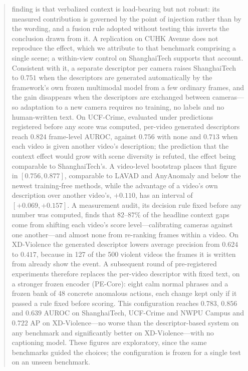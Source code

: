 \documentclass[a4paper,fleqn]{cas-sc}
\begin{document}
\begin{abstract}
finding is that verbalized context is load-bearing but not robust: its measured
contribution is governed by the point of injection rather than by the wording,
and a fusion rule adopted without testing this inverts the conclusion drawn from
it. A replication on CUHK Avenue does not reproduce the effect, which we
attribute to that benchmark comprising a single scene; a within-view control on
ShanghaiTech supports that account. Consistent with it, a separate descriptor per
camera raises ShanghaiTech to $0.751$ when the descriptors are generated
automatically by the framework's own frozen multimodal model from a few ordinary
frames, and the gain disappears when the descriptors are exchanged between
cameras---so adaptation to a new camera requires no training, no labels and no
human-written text. On UCF-Crime, evaluated under predictions registered before
any score was computed, per-video generated descriptors reach $0.824$
frame-level AUROC, against $0.756$ with none and $0.713$ when each video is given
another video's description; the prediction that the context effect would grow
with scene diversity is refuted, the effect being comparable to ShanghaiTech's.
A video-level bootstrap places that figure in $[0.756, 0.877]$, comparable to
LAVAD and AnyAnomaly and below the newest training-free methods, while the
advantage of a video's own description over another video's, $+0.110$, has an
interval of $[+0.069, +0.157]$. A measurement audit, its decision rule fixed
before any number was computed, finds that $82$--$87\%$ of the headline context
gaps come from shifting each video's score level---calibrating cameras against
one another---and almost none from re-ranking frames within a video. On
XD-Violence the generated descriptor lowers average precision from $0.624$ to
$0.417$, because in 127 of the 500 violent videos the frames it is written from
already show the event. A subsequent round of pre-registered experiments
therefore replaces the per-video descriptor with fixed text, on a stronger frozen
encoder (PE-Core): eight calm normal phrases and a frozen bank of 48 concrete
anomalous actions, each change kept only if it passed a rule fixed before
scoring. This configuration reaches $0.783$, $0.856$ and $0.639$ AUROC on
ShanghaiTech, UCF-Crime and NWPU Campus and $0.722$ AP on XD-Violence---no worse
than the descriptor-based system on any benchmark and significantly better on
XD-Violence---with no captioning model. These figures are exploratory, since the
same benchmarks guided the choices; the configuration is frozen for a single test
on an unseen benchmark.
\end{abstract}
\end{document}
